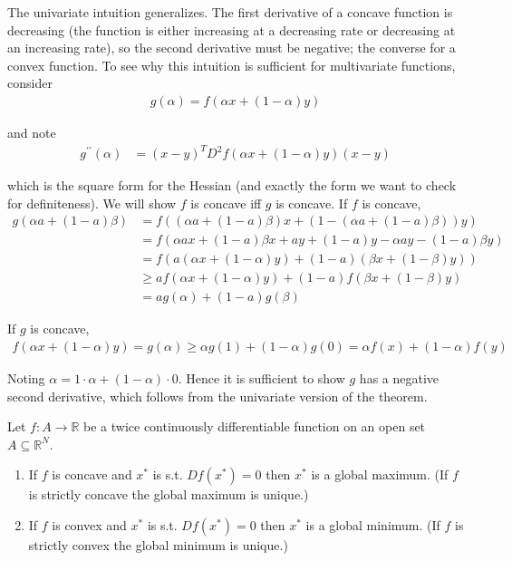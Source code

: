 \documentclass{article}
\begin{document}
\begin{remark}
  The univariate intuition generalizes. The first derivative of a concave function is decreasing (the function is either increasing at a decreasing rate or decreasing at an increasing rate), so the second derivative must be negative; the converse for a convex function. To see why this intuition is sufficient for multivariate functions, consider
  \begin{align*}
    g(\alpha) = f(\alpha x + (1 - \alpha) y)
  \end{align*}

  and note
  \begin{align*}
    g^{\prime\prime}(\alpha) & = (x - y)^T D^2 f(\alpha x + (1 - \alpha) y) (x - y)
  \end{align*}

  which is the square form for the Hessian (and exactly the form we want to check for definiteness). We will show $f$ is concave iff $g$ is concave. If $f$ is concave,
  \begin{align*}
    g(\alpha a + (1 - a) \beta)
    &
    =
    f((\alpha a + (1 - a) \beta) x + (1 - (\alpha a + (1 - a) \beta)) y)
    \\
    &
    =
    f\left(
      \alpha a x + 
      (1 - a) \beta x 
      +
      a y
      +
      (1 - a) y
      - 
      \alpha a y 
      - 
      (1 - a) \beta y
    \right)
    \\
    &
    =
    f\left(
      a (\alpha x + (1 - \alpha) y)
      +
      (1 - a) (\beta x + (1 - \beta) y)
    \right)
    \\
    &
    \ge
    a 
    f(\alpha x + (1 - \alpha) y)
    +
    (1 - a) f(\beta x + (1 - \beta) y)
    \\
    &
    =
    a g(\alpha) + (1 - a) g(\beta)
  \end{align*}

  If $g$ is concave,
  \begin{align*}
    f(\alpha x + (1 - \alpha) y) = g(\alpha) \ge \alpha g(1) + (1 - \alpha) g(0) = \alpha f(x) + (1 - \alpha) f(y)
  \end{align*}

  Noting $\alpha = 1 \cdot\alpha + (1 - \alpha) \cdot 0$. Hence it is sufficient to show $g$ has a negative second derivative, which follows from the univariate version of the theorem.
\end{remark}

\begin{theorem}
  Let $f: A \to \mathbb{R}$ be a twice continuously differentiable function on an open set $A \subseteq \mathbb{R}^N$.
  \begin{enumerate}
    \item If $f$ is concave and $x^*$ is s.t. $Df(x^*) = 0$ then $x^*$ is a global maximum. (If $f$ is strictly concave the global maximum is unique.)

    \item If $f$ is convex and $x^*$ is s.t. $Df(x^*) = 0$ then $x^*$ is a global minimum. (If $f$ is strictly convex the global minimum is unique.)
  \end{enumerate}
\end{theorem}
\end{document}
